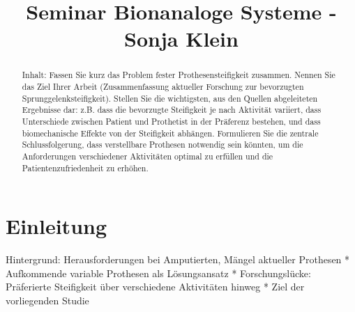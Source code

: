\documentclass{SeminarV2}
\begin{document}
\title{Seminar Bionanaloge Systeme - Sonja Klein}
\maketitle

\begin{abstract}
  \cite{InstituteofElectricalandElectronicsEngineers.2024}
Inhalt: Fassen Sie kurz das Problem fester Prothesensteifigkeit zusammen. Nennen Sie das Ziel Ihrer Arbeit (Zusammenfassung aktueller Forschung zur bevorzugten Sprunggelenksteifigkeit). Stellen Sie die wichtigsten, aus den Quellen abgeleiteten Ergebnisse dar: z.B. dass die bevorzugte Steifigkeit je nach Aktivität variiert, dass Unterschiede zwischen Patient und Prothetist in der Präferenz bestehen, und dass biomechanische Effekte von der Steifigkeit abhängen. Formulieren Sie die zentrale Schlussfolgerung, dass verstellbare Prothesen notwendig sein könnten, um die Anforderungen verschiedener Aktivitäten optimal zu erfüllen und die Patientenzufriedenheit zu erhöhen.


\end{abstract}

\section{Einleitung}
Hintergrund: Herausforderungen bei Amputierten, Mängel aktueller Prothesen *   Aufkommende variable Prothesen als Lösungsansatz *   Forschungslücke: Präferierte Steifigkeit über verschiedene Aktivitäten hinweg *   Ziel der vorliegenden Studie
\end{document}
